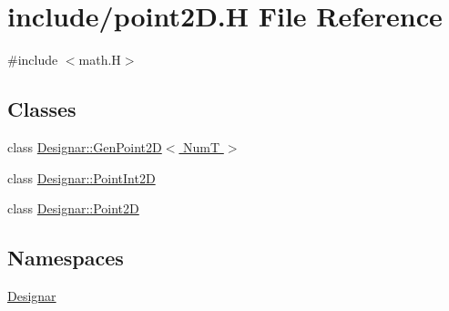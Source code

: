\hypertarget{point2_d_8_h}{}\section{include/point2D.H File Reference}
\label{point2_d_8_h}
{\ttfamily \#include $<$math.\+H$>$}\newline
\subsection*{Classes}
\begin{DoxyCompactItemize}
\item 
class \hyperlink{class_designar_1_1_gen_point2_d}{Designar\+::\+Gen\+Point2\+D$<$ Num\+T $>$}
\item 
class \hyperlink{class_designar_1_1_point_int2_d}{Designar\+::\+Point\+Int2D}
\item 
class \hyperlink{class_designar_1_1_point2_d}{Designar\+::\+Point2D}
\end{DoxyCompactItemize}
\subsection*{Namespaces}
\begin{DoxyCompactItemize}
\item 
 \hyperlink{namespace_designar}{Designar}
\end{DoxyCompactItemize}
